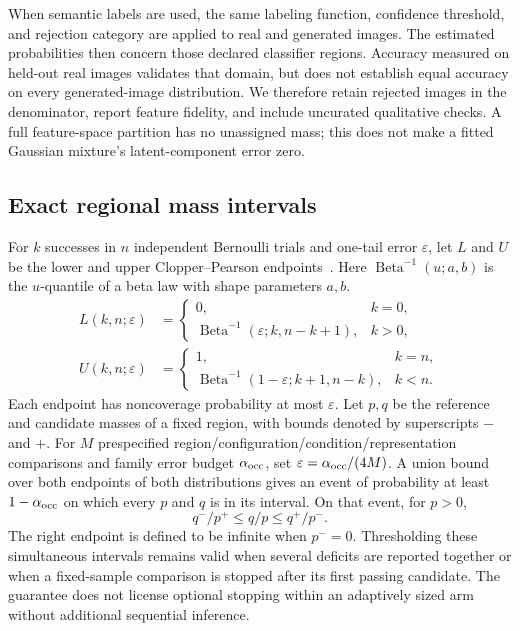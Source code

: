 When semantic labels are used, the same labeling function, confidence threshold,
and rejection category are applied to real and generated images. The estimated
probabilities then concern those declared classifier regions. Accuracy measured
on held-out real images validates that domain, but does not establish equal
accuracy on every generated-image distribution. We therefore retain rejected
images in the denominator, report feature fidelity, and include uncurated
qualitative checks. A full feature-space partition has no unassigned mass;
this does not make a fitted Gaussian mixture's latent-component error zero.

\subsection{Exact regional mass intervals}
For $k$ successes in $n$ independent Bernoulli trials and one-tail error
$\varepsilon$, let $L$ and $U$ be the lower and upper
Clopper--Pearson endpoints~\cite{clopper1934confidence}.
Here $\operatorname{Beta}^{-1}(u;a,b)$ is the $u$-quantile of a beta
law with shape parameters $a,b$.
\begin{align}
L(k,n;\varepsilon)&=\begin{cases}0,&k=0,\\
\operatorname{Beta}^{-1}(\varepsilon;k,n-k+1),&k>0,
\end{cases}\label{eq:cp_lower}\\
U(k,n;\varepsilon)&=\begin{cases}1,&k=n,\\
\operatorname{Beta}^{-1}(1-\varepsilon;k+1,n-k),&k<n.
\end{cases}\label{eq:cp_upper}
\end{align}
Each endpoint has noncoverage probability at most $\varepsilon$.
Let $p,q$ be the reference and candidate masses of a fixed region,
with bounds denoted by superscripts $-$ and $+$.
For $M$ prespecified region/configuration/condition/representation comparisons
and family error budget $\alpha_{\rm occ}$, set $\varepsilon=\alpha_{\rm occ}/(4M)$.
A union bound over both endpoints of both
distributions gives an event of probability at least $1-\alpha_{\rm occ}$ on
which every $p$ and $q$ is in its interval. On that event, for $p>0$,
\begin{equation}
q^-/p^+\leq q/p\leq q^+/p^-.
\label{eq:supp_occupancy}
\end{equation}
The right endpoint is defined to be infinite when $p^-=0$.
Thresholding these simultaneous intervals remains valid when several deficits
are reported together or when a fixed-sample comparison is stopped after its
first passing candidate. The guarantee does not license optional stopping
within an adaptively sized arm without additional sequential inference.

